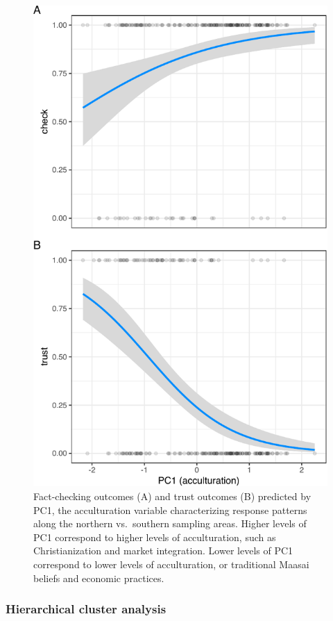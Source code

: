\documentclass[
  11pt,
]{article}
\begin{document}
\begin{figure}
\centering
\includegraphics{trust-advice-writeup_files/figure-latex/pca_effplot-1.pdf}
\caption{Fact-checking outcomes (A) and trust outcomes (B) predicted by
PC1, the acculturation variable characterizing response patterns along
the northern vs.~southern sampling areas. Higher levels of PC1
correspond to higher levels of acculturation, such as Christianization
and market integration. Lower levels of PC1 correspond to lower levels
of acculturation, or traditional Maasai beliefs and economic practices.}
\end{figure}

\hypertarget{hierarchical-cluster-analysis}{%
\subsubsection{Hierarchical cluster
analysis}\label{hierarchical-cluster-analysis}}
\end{document}
